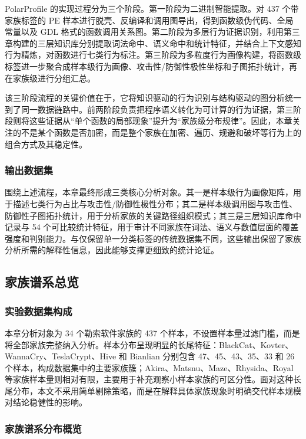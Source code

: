 PolarProfile 的实现过程分为三个阶段。第一阶段为二进制智能提取。对 437 个带家族标签的 PE 样本进行脱壳、反编译和调用图导出，得到函数级伪代码、全局常量以及 GDL 格式的函数调用关系图。第二阶段为多层行为证据识别，利用第三章构建的三层知识库分别提取词法命中、语义命中和统计特征，并结合上下文感知行为精炼，对函数进行七类行为标注。第三阶段为多粒度行为画像构建，将函数级标签进一步聚合成样本级行为画像、攻击性/防御性极性坐标和子图拓扑统计，再在家族级进行分组汇总。

该三阶段流程的关键价值在于，它将知识驱动的行为识别与结构驱动的图分析统一到了同一数据链路中。前两阶段负责把程序语义转化为可计算的行为证据，第三阶段则将这些证据从“单个函数的局部现象”提升为“家族级分布规律”。因此，本章关注的不是某个函数是否加密，而是整个家族在加密、遍历、规避和破坏等行为上的组合方式及其稳定性。

\subsubsection{输出数据集}

围绕上述流程，本章最终形成三类核心分析对象。其一是样本级行为画像矩阵，用于描述七类行为占比与攻击性/防御性极性分布；其二是样本级调用图与攻击性、 防御性子图拓扑统计，用于分析家族的关键路径组织模式；其三是三层知识库命中记录与 54 个可比较统计特征，用于审计不同家族在词法、语义与数值层面的覆盖强度和判别能力。与仅保留单一分类标签的传统数据集不同，这些输出保留了家族分析所需的解释性信息，因此能够支撑更细致的统计论证。

\subsection{家族谱系总览}

\subsubsection{实验数据集构成}

本章分析对象为 34 个勒索软件家族的 437 个样本，不设置样本量过滤门槛，而是将全部家族完整纳入分析。样本分布呈现明显的长尾特征：BlackCat、Kovter、WannaCry、TeslaCrypt、Hive 和 Bianlian 分别包含 47、45、43、35、33 和 26 个样本，构成数据集中的主要家族簇；Akira、Matsnu、Maze、Rhysida、Royal 等家族样本量则相对有限，主要用于补充观察小样本家族的可区分性。面对这种长尾分布，本文不采用简单剔除策略，而是在解释具体家族现象时明确交代样本规模对结论稳健性的影响。

\subsubsection{家族谱系分布概览}

